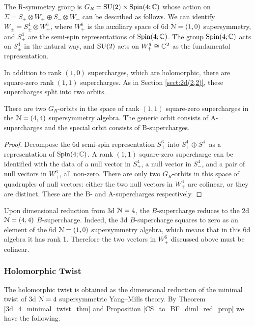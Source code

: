 \documentclass[10pt, oneside]{article}
\begin{document}
The R-symmetry group is $G_R = \mathrm{SU}(2) \times \mathrm{Spin}(4;\mathbb C)$ whose action on $\Sigma = S_+ \otimes W_+ \oplus S_- \otimes W_-$ can be described as follows.
We can identify $W_\pm = S^4_\pm \otimes W_+^6$, where $W_+^6$ is the auxiliary space of 6d $\mathcal N=(1,0)$ supersymmetry, and $S^4_\pm$ are the semi-spin representations of $\mathrm{Spin}(4;\mathbb C)$. 
The group $\mathrm{Spin}(4;\mathbb C)$ acts on $S^4_\pm$ in the natural way, and $\mathrm{SU}(2)$ acts on $W_+^6 \cong \mathbb C^2$ as the fundamental representation.

In addition to rank $(1,0)$ supercharges, which are holomorphic, there are square-zero rank $(1,1)$ supercharges.  
As in Section \ref{sect:2d(2,2)}, these supercharges split into two orbits.

\begin{prop}
There are two $G_R$-orbits in the space of rank $(1,1)$ square-zero supercharges in the $\mathcal{N}=(4,4)$ supersymmetry algebra. The generic orbit consists of A-supercharges and the special orbit consists of B-supercharges.
\label{prop:2d44twoorbits}
\end{prop}

\begin{proof}
Decompose the 6d semi-spin representation $S_+^6$ into $S_+^4 \oplus S_-^4$ as a representation of $\mathrm{Spin}(4;\mathbb C)$. 
A rank $(1,1)$ square-zero supercharge can be identified with the data of a null vector in $S_+^4$, a null vector in $S_-^4$, and a pair of null vectors in $W_+^6$, all non-zero.  
There are only two $G_R$-orbits in this space of quadruples of null vectors: either the two null vectors in $W_+^6$ are colinear, or they are distinct.  
These are the B- and A-supercharges respectively.
\end{proof}

Upon dimensional reduction from 3d $\mathcal{N}=4$, the $B$-supercharge reduces to the 2d $\mathcal{N}=(4,4)$ $B$-supercharge.  
Indeed, the 3d $B$-supercharge squares to zero as an element of the 6d $\mathcal{N}=(1,0)$ supersymmetry algebra, which means that in this 6d algebra it has rank 1.  
Therefore the two vectors in $W_+^6$ discussed above must be colinear. 

\subsubsection{Holomorphic Twist} \label{sect:2d44minimaltwist}
The holomorphic twist is obtained as the dimensional reduction of the minimal twist of 3d $\mathcal{N}=4$ supersymmetric Yang--Mills theory.
By Theorem \ref{3d_4_minimal_twist_thm} and Proposition \ref{CS_to_BF_diml_red_prop} we have the following. 
\end{document}
